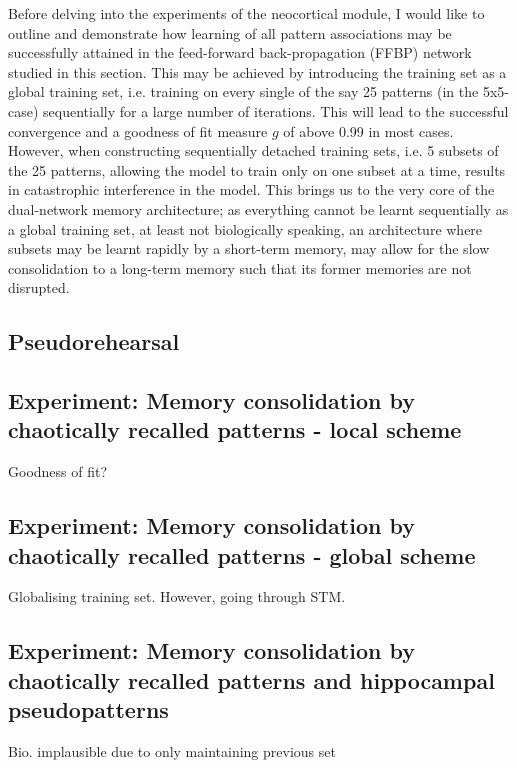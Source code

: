 Before delving into the experiments of the neocortical module, I would like to outline and demonstrate how learning of all pattern associations may be successfully attained in the feed-forward back-propagation (FFBP) network studied in this section. This may be achieved by introducing the training set as a global training set, i.e. training on every single of the say 25 patterns (in the 5x5-case) sequentially for a large number of iterations. This will lead to the successful convergence and a goodness of fit measure $g$ of above 0.99 in most cases. However, when constructing sequentially detached training sets, i.e. 5 subsets of the 25 patterns, allowing the model to train only on one subset at a time, results in catastrophic interference in the model. This brings us to the very core of the dual-network memory architecture; as everything cannot be learnt sequentially as a global training set, at least not biologically speaking, an architecture where subsets may be learnt rapidly by a short-term memory, may allow for the slow consolidation to a long-term memory such that its former memories are not disrupted.


\subsection{Pseudorehearsal}

\citep{Ans1997}

\subsection{Experiment: Memory consolidation by chaotically recalled patterns - local scheme}

Goodness of fit?

\subsection{Experiment: Memory consolidation by chaotically recalled patterns - global scheme}

Globalising training set. However, going through STM.


\subsection{Experiment: Memory consolidation by chaotically recalled patterns and hippocampal pseudopatterns}

Bio. implausible due to only maintaining previous set

